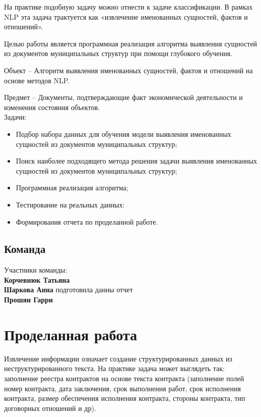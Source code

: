 \documentclass{article}
\begin{document}
На практике подобную задачу можно отнести к задаче классификации. В рамках NLP эта задача трактуется как «извлечение именованных сущностей, фактов и отношений». 

Целью работы является программная реализация алгоритма выявления сущностей из документов муниципальных структур при помощи глубокого обучения. 

Объект – Алгоритм выявления именованных сущностей, фактов и отношений на основе методов NLP. 

Предмет – Документы, подтверждающие факт экономической деятельности и изменения состояния объектов. \\
Задачи: 
\begin{itemize}
    \item Подбор набора данных для обучения модели выявления именованных сущностей из документов муниципальных структур;
    \item Поиск наиболее подходящего метода решения задачи выявления именованных сущностей из документов муниципальных структур;
    \item Программная реализация алгоритма;
    \item Тестирование на реальных данных:
    \item Формирования отчета по проделанной работе.
\end{itemize}

\subsection{Команда}
Участники команды: \\ 

\textbf{Корчевнюк Татьяна} \\ 

\textbf{Шаркова Анна} подготовила данны отчет \\ 

\textbf{Прошян Гарри}  \\ 




\section{Проделанная работа}
Извлечение информации означает создание структурированных данных из неструктурированного текста. На практике задача может выглядеть так: заполнение реестра контрактов на основе текста контракта (заполнение полей номер контракта, дата заключения, срок выполнения работ, срок исполнения контракта, размер обеспечения исполнения контракта, стороны контракта, тип договорных отношений и др).
\end{document}
